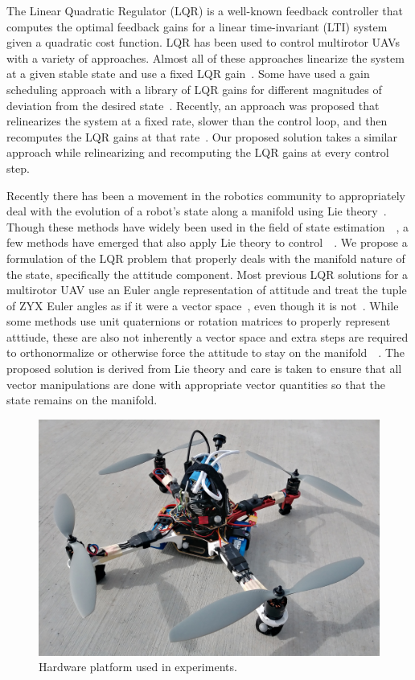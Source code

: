 

The Linear Quadratic Regulator (LQR) is a well-known feedback controller that
computes the optimal feedback gains for a linear time-invariant (LTI) system
given a quadratic cost function. LQR has been used to control multirotor UAVs with a variety of
approaches. Almost all of these approaches
linearize the system at a given stable state and use a fixed LQR
gain~\cite{cowling2007prototype}. Some have
used a gain scheduling approach with a library of LQR gains for different
magnitudes of deviation from the desired state~\cite{reyes2013lqr}. Recently, an approach was
proposed that relinearizes the system at a fixed rate, slower than the control
loop, and then recomputes the LQR gains at that rate~\cite{foehn2018onboard}. Our
proposed solution takes a similar approach while relinearizing and recomputing
the LQR gains at every control step. 

Recently there has been a movement in the robotics community to appropriately
deal with the evolution of a robot's state along a manifold using Lie
theory~\cite{sola2018micro}. Though these methods have widely been used in the
field of state estimation~\cite{sola2017quaternion}~\cite{koch2017relative}, a
few methods have emerged that also apply Lie theory to
control~\cite{yu2015high}~\cite{lee2010geometric}. We propose a formulation of
the LQR problem that properly deals with the manifold nature of the state,
specifically the attitude component. Most previous LQR solutions
for a multirotor UAV use an Euler angle representation of attitude and treat the
tuple of ZYX Euler angles as if it were a vector space~\cite{cowling2007prototype}, even
though it is not~\cite{diebel2006representing}. While some methods use unit
quaternions or rotation matrices to properly represent atttiude, these are also
not inherently a vector space and extra steps are required to orthonormalize or
otherwise force the attitude to stay on the
manifold~\cite{reyes2013lqr}~\cite{foehn2018onboard}. The proposed solution is
derived from Lie theory and care is taken to ensure that all vector
manipulations are done with
appropriate vector quantities so that the state remains on the manifold.

\begin{figure}
  \centering
  \includegraphics[scale=0.15]{figures/hardware_platform.jpg}
  \caption[Multirotor UAV Used in Experiments]{Hardware platform used in experiments.}
  \label{f:drone_pic}
\end{figure}
